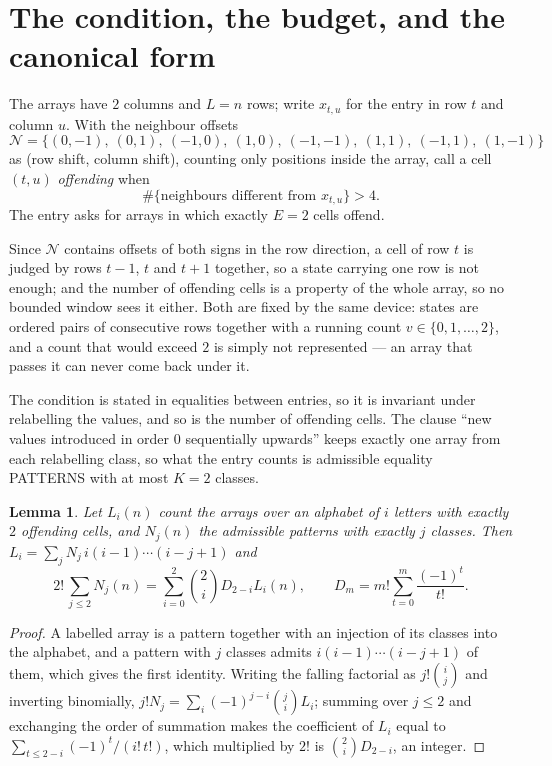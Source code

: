 \documentclass[11pt,a4paper]{article}
\theoremstyle{plain}
\newtheorem{lemma}[theorem]{Lemma}
\theoremstyle{definition}
\begin{document}
\section{The condition, the budget, and the canonical form}

The arrays have $2$ columns and $L=n$ rows; write $x_{t,u}$ for the entry in
row $t$ and column $u$. With the neighbour offsets
\[
\mathcal N=\{(0,-1),\ (0,1),\ (-1,0),\ (1,0),\ (-1,-1),\ (1,1),\ (-1,1),\ (1,-1)\}
\]
as (row shift, column shift), counting only positions inside the array, call a cell
$(t,u)$ \emph{offending} when
\[
\#\{\text{neighbours different from }x_{t,u}\}>4 .
\]
The entry asks for arrays in which exactly $E=2$ cells offend.

Since $\mathcal N$ contains offsets of both signs in the row direction, a cell of row
$t$ is judged by rows $t-1$, $t$ and $t+1$ together, so a state carrying one row is not
enough; and the number of offending cells is a property of the whole array, so no bounded
window sees it either. Both are fixed by the same device: states are ordered pairs of
consecutive rows together with a running count $v\in\{0,1,\dots,2\}$, and a count that
would exceed $2$ is simply not represented --- an array that passes it can never come back
under it.

The condition is stated in equalities between entries, so it is invariant under relabelling
the values, and so is the number of offending cells. The clause ``new values introduced in
order $0$ sequentially upwards'' keeps exactly one array from each relabelling class, so what
the entry counts is admissible equality PATTERNS with at most $K=2$ classes.

\begin{lemma}\label{lem:inv}
Let $L_i(n)$ count the arrays over an alphabet of $i$ letters with exactly $2$ offending
cells, and $N_j(n)$ the admissible patterns with exactly $j$ classes. Then
$L_i=\sum_j N_j\,i(i-1)\cdots(i-j+1)$ and
\[
2!\,\sum_{j\le2}N_j(n)=\sum_{i=0}^{2}\binom{2}{i}D_{2-i}L_i(n),
\qquad D_m=m!\sum_{t=0}^{m}\frac{(-1)^t}{t!} .
\]
\end{lemma}

\begin{proof}
A labelled array is a pattern together with an injection of its classes into the alphabet,
and a pattern with $j$ classes admits $i(i-1)\cdots(i-j+1)$ of them, which gives the first
identity. Writing the falling factorial as $j!\binom{i}{j}$ and inverting binomially,
$j!N_j=\sum_i(-1)^{j-i}\binom{j}{i}L_i$; summing over $j\le2$ and exchanging the
order of summation makes the coefficient of $L_i$ equal to
$\sum_{t\le2-i}(-1)^t/(i!\,t!)$, which multiplied by $2!$ is
$\binom{2}{i}D_{2-i}$, an integer.
\end{proof}
\end{document}
